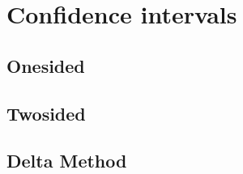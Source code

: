 \section{Confidence intervals}
\subsection*{Onesided}
\subsection*{Twosided}
\subsection*{Delta Method}